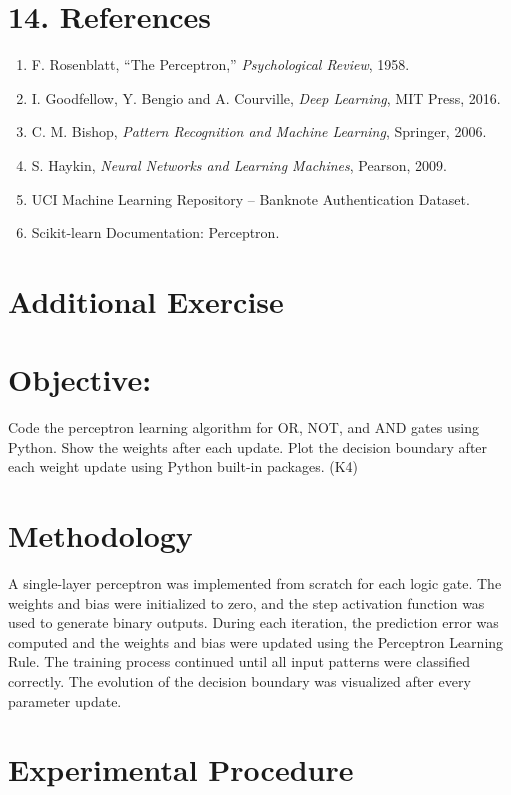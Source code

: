 \documentclass[11pt]{article}
\begin{document}

\section*{14. References}

\begin{enumerate}
\item F. Rosenblatt, ``The Perceptron,'' \emph{Psychological Review}, 1958.
\item I. Goodfellow, Y. Bengio and A. Courville, \emph{Deep Learning}, MIT Press, 2016.
\item C. M. Bishop, \emph{Pattern Recognition and Machine Learning}, Springer, 2006.
\item S. Haykin, \emph{Neural Networks and Learning Machines}, Pearson, 2009.
\item UCI Machine Learning Repository -- Banknote Authentication Dataset.
\item Scikit-learn Documentation: Perceptron.
\end{enumerate}
\vspace{300mm}
\section*{Additional Exercise}
\section{Objective:}
Code the perceptron learning algorithm for OR, NOT, and AND gates using Python. Show the weights after each update. Plot the decision boundary after each weight update using Python built-in packages. (K4)

\section{Methodology}

A single-layer perceptron was implemented from scratch for each logic gate. The weights and bias were initialized to zero, and the step activation function was used to generate binary outputs. During each iteration, the prediction error was computed and the weights and bias were updated using the Perceptron Learning Rule. The training process continued until all input patterns were classified correctly. The evolution of the decision boundary was visualized after every parameter update.

\section{Experimental Procedure}
\end{document}
